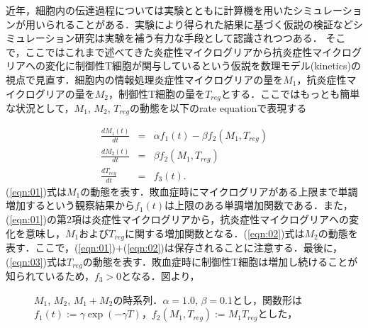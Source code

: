 \documentclass{jsarticle}
\begin{document}
近年，細胞内の伝達過程については実験とともに計算機を用いたシミュレーションが用いられることがある．実験により得られた結果に基づく仮説の検証などシミュレーション研究は実験を補う有力な手段として認識されつつある．
そこで，ここではこれまで述べてきた炎症性マイクログリアから抗炎症性マイクログリアへの変化に制御性T細胞が関与しているという仮説を数理モデル(kinetics)の視点で見直す．細胞内の情報処理炎症性マイクログリアの量を$M_1$，抗炎症性マイクログリアの量を$M_2$，制御性T細胞の量を$T_{reg}$とする．ここではもっとも簡単な状況として，$M_1$, $M_2$, $T_{reg}$の動態を以下のrate equationで表現する

\begin{eqnarray}
  \label{eqn:01}
  \frac{dM_{1}(t)}{dt} &=& \alpha f_1(t)- \beta f_2(M_1, T_{reg}) \\
  \label{eqn:02}
  \frac{dM_2(t)}{dt} &=& \beta f_2(M_1, T_{reg}) \\
  \label{eqn:03}
  \frac{dT_{reg}}{dt} &=& f_3(t).
\end{eqnarray}
(\ref{eqn:01})式は$M_1$の動態を表す．敗血症時にマイクログリアがある上限まで単調増加するという観察結果から$f_1(t)$は上限のある単調増加関数である．また，(\ref{eqn:01})の第2項は炎症性マイクログリアから，抗炎症性マイクログリアへの変化を意味し，$M_1$および$T_{reg}$に関する増加関数となる．(\ref{eqn:02})式は$M_2$の動態を表す．ここで，(\ref{eqn:01})$+$(\ref{eqn:02})は保存されることに注意する．最後に，(\ref{eqn:03})式は$T_{reg}$の動態を表す．敗血症時に制御性T細胞は増加し続けることが知られているため，$f_3>0$となる．図より，

\begin{figure}[h]
  \centering
        \caption{$M_1$, $M_2$, $M_1+M_2$の時系列．$\alpha=1.0$, $\beta=0.1$とし，関数形は$f_1(t):= \gamma\exp{(-\gamma T)}$，$f_2(M_1, T_{reg}):=M_1T_{reg}$とした，}
      \label{fig:01}
  \end{figure}
\end{document}
